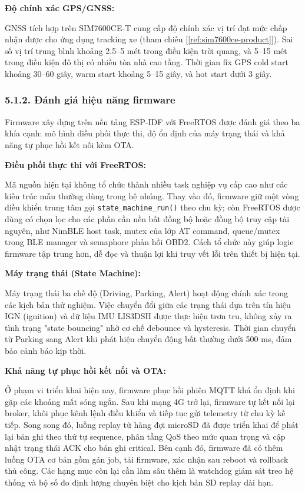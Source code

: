 \documentclass[13pt,a4paper]{extarticle}
\renewcommand{\\}{\thesislongtableorignewline\hline}%
\newcommand{\ieeecite}[1]{[\ref{#1}]}
\providecommand{\textcite}[1]{\ieeecite{#1}}
\begin{document}
\textbf{Độ chính xác GPS/GNSS:}

GNSS tích hợp trên SIM7600CE-T cung cấp độ chính xác vị trí đạt mức chấp
nhận được cho ứng dụng tracking xe (tham chiếu \textcite{ref:sim7600ce-product}). Sai số vị trí trung bình khoảng
2.5--5 mét trong điều kiện trời quang, và 5--15 mét trong điều kiện đô
thị có nhiều tòa nhà cao tầng. Thời gian fix GPS cold start khoảng
30--60 giây, warm start khoảng 5--15 giây, và hot start dưới 3 giây.

\subsubsection{5.1.2. Đánh giá hiệu năng
firmware}\label{512-ux111uxe1nh-giuxe1-hiux1ec7u-nux103ng-firmware}

Firmware xây dựng trên nền tảng ESP-IDF với FreeRTOS được đánh giá theo
ba khía cạnh: mô hình điều phối thực thi, độ ổn định của máy trạng thái
và khả năng tự phục hồi kết nối kèm OTA.

\textbf{Điều phối thực thi với FreeRTOS:}

Mã nguồn hiện tại không tổ chức thành nhiều task nghiệp vụ cấp cao như
các kiến trúc mẫu thường dùng trong hệ nhúng. Thay vào đó, firmware giữ
một vòng điều khiển trung tâm gọi \texttt{state\_machine\_run()} theo
chu kỳ; còn FreeRTOS được dùng có chọn lọc cho các phần cần nền bất đồng
bộ hoặc đồng bộ truy cập tài nguyên, như NimBLE host task, mutex của lớp
AT command, queue/mutex trong BLE manager và semaphore phản hồi OBD2.
Cách tổ chức này giúp logic firmware tập trung hơn, dễ đọc và thuận lợi
khi truy vết lỗi trên thiết bị hiện tại.

\textbf{Máy trạng thái (State Machine):}

Máy trạng thái ba chế độ (Driving, Parking, Alert) hoạt động chính xác
trong các kịch bản thử nghiệm. Việc chuyển đổi giữa các trạng thái dựa
trên tín hiệu IGN (ignition) và dữ liệu IMU LIS3DSH được thực hiện trơn
tru, không xảy ra tình trạng "state bouncing" nhờ cơ chế debounce và
hysteresis. Thời gian chuyển từ Parking sang Alert khi phát hiện chuyển
động bất thường dưới 500 ms, đảm bảo cảnh báo kịp thời.

\textbf{Khả năng tự phục hồi kết nối và OTA:}

Ở phạm vi triển khai hiện nay, firmware phục hồi phiên MQTT khá ổn định
khi gặp các khoảng mất sóng ngắn. Sau khi mạng 4G trở lại, firmware tự
kết nối lại broker, khôi phục kênh lệnh điều khiển và tiếp tục gửi
telemetry từ chu kỳ kế tiếp. Song song đó, luồng replay từ hàng đợi
microSD đã được triển khai để phát lại bản ghi theo thứ tự sequence,
phân tầng QoS theo mức quan trọng và cập nhật trạng thái ACK cho bản ghi
critical. Bên cạnh đó, firmware đã có thêm luồng OTA cơ bản gồm gán job,
tải firmware, xác nhận sau reboot và rollback thủ công. Các hạng mục còn
lại cần làm sâu thêm là watchdog giám sát treo hệ thống và bộ số đo định
lượng chuyên biệt cho kịch bản SD replay dài hạn.
\end{document}
